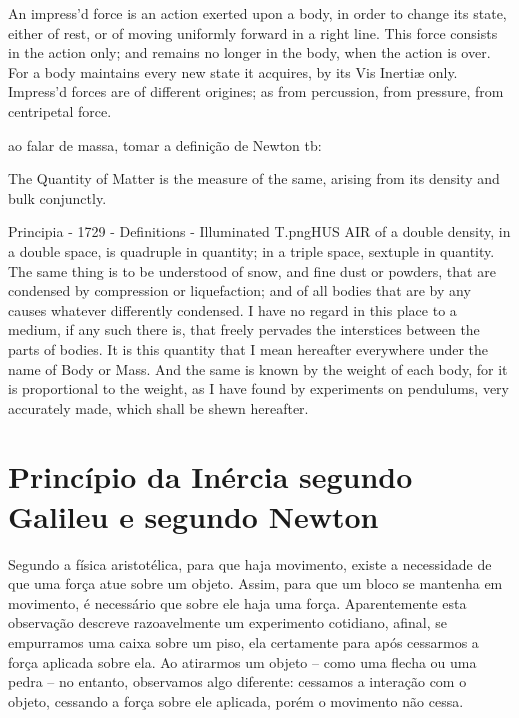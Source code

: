 An impress'd force is an action exerted upon a body, in order to change its state, either of rest, or of moving uniformly forward in a right line.
This force consists in the action only; and remains no longer in the body, when the action is over. For a body maintains every new state it acquires, by its Vis Inertiæ only. Impress'd forces are of different origines; as from percussion, from pressure, from centripetal force. 

ao falar de massa, tomar a definição de Newton tb:


The Quantity of Matter is the measure of the same, arising from its density and bulk conjunctly.

Principia - 1729 - Definitions - Illuminated T.pngHUS AIR of a double density, in a double space, is quadruple in quantity; in a triple space, sextuple in quantity. The same thing is to be understood of snow, and fine dust or powders, that are condensed by compression or liquefaction; and of all bodies that are by any causes whatever differently condensed. I have no regard in this place to a medium, if any such there is, that freely pervades the interstices between the parts of bodies. It is this quantity that I mean hereafter everywhere under the name of Body or Mass. And the same is known by the weight of each body, for it is proportional to the weight, as I have found by experiments on pendulums, very accurately made, which shall be shewn hereafter.


\section{Princípio da Inércia segundo Galileu e segundo Newton}

Segundo a física aristotélica, para que haja movimento, existe a necessidade de que uma força atue sobre um objeto. Assim, para que um bloco se mantenha em movimento, é necessário que sobre ele haja uma força. Aparentemente esta observação descreve razoavelmente um experimento cotidiano, afinal, se empurramos uma caixa sobre um piso, ela certamente para após cessarmos a força aplicada sobre ela. Ao atirarmos um objeto -- como uma flecha ou uma pedra -- no entanto, observamos algo diferente: cessamos a interação com o objeto, cessando a força sobre ele aplicada, porém o movimento não cessa.

